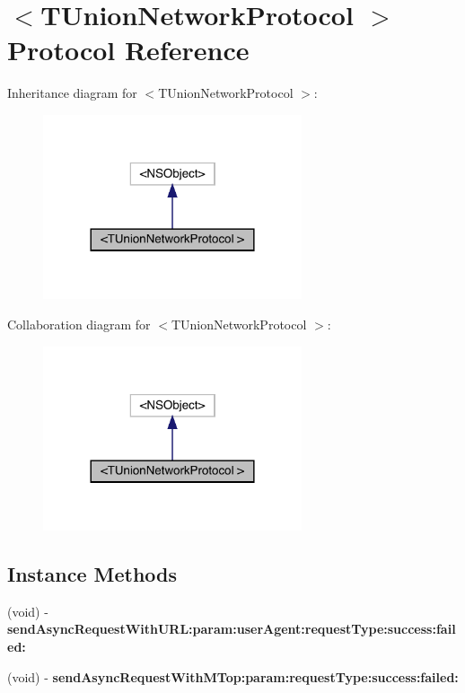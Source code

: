 \hypertarget{protocol_t_union_network_protocol_01-p}{}\section{$<$T\+Union\+Network\+Protocol $>$ Protocol Reference}
\label{protocol_t_union_network_protocol_01-p}


Inheritance diagram for $<$T\+Union\+Network\+Protocol $>$\+:\nopagebreak
\begin{figure}[H]
\begin{center}
\leavevmode
\includegraphics[width=216pt]{protocol_t_union_network_protocol_01-p__inherit__graph}
\end{center}
\end{figure}


Collaboration diagram for $<$T\+Union\+Network\+Protocol $>$\+:\nopagebreak
\begin{figure}[H]
\begin{center}
\leavevmode
\includegraphics[width=216pt]{protocol_t_union_network_protocol_01-p__coll__graph}
\end{center}
\end{figure}
\subsection*{Instance Methods}
\begin{DoxyCompactItemize}
\item 
\mbox{\label{protocol_t_union_network_protocol_01-p_ab95802c31acfe3e7a33a8ac8e57f3336}} 
(void) -\/ {\bfseries send\+Async\+Request\+With\+U\+R\+L\+:param\+:user\+Agent\+:request\+Type\+:success\+:failed\+:}
\item 
\mbox{\label{protocol_t_union_network_protocol_01-p_aea4817482328ae5d77c320feedb923ec}} 
(void) -\/ {\bfseries send\+Async\+Request\+With\+M\+Top\+:param\+:request\+Type\+:success\+:failed\+:}
\end{DoxyCompactItemize}


